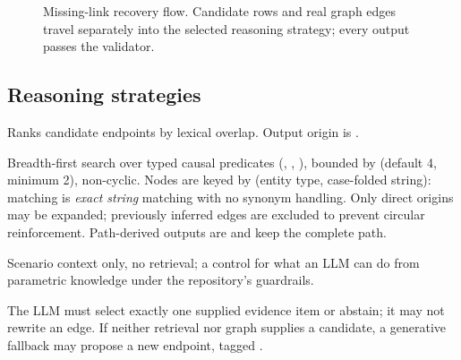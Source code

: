 \documentclass[10pt,twocolumn,a4paper]{extarticle}
\begin{document}
\begin{figure}[t]
\centering
{}
\caption{Missing-link recovery flow. Candidate rows and real graph edges travel separately into the selected reasoning strategy; every output passes the validator.}
\label{fig:flow}
\end{figure}

\subsection{Reasoning strategies}
\begin{description}[leftmargin=0pt,itemsep=2pt]
  \item[\code{TfidfRetriever}.] Ranks candidate endpoints by lexical overlap. Output origin is .
  \item[\code{GraphReasoner}.] Breadth-first search over typed causal predicates (, , ), bounded by  (default 4, minimum 2), non-cyclic. Nodes are keyed by (entity type, case-folded string): matching is \emph{exact string} matching with no synonym handling. Only direct origins may be expanded; previously inferred edges are excluded to prevent circular reinforcement. Path-derived outputs are  and keep the complete path.
  \item[\code{PromptOnlyReasoner}.] Scenario context only, no retrieval; a control for what an LLM can do from parametric knowledge under the repository's guardrails.
  \item[Evidence-grounded LLM and \code{HybridReasoner}.] The LLM must select exactly one supplied evidence item or abstain; it may not rewrite an edge. If neither retrieval nor graph supplies a candidate, a generative fallback may propose a new endpoint, tagged .
\end{description}
\end{document}
